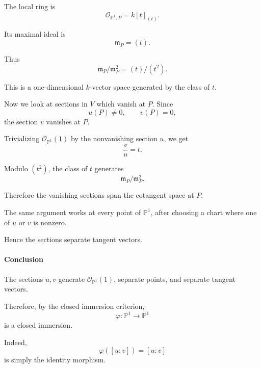 The local ring is
\[
\mathcal O_{\mathbb P^1,P}=k[t]_{(t)}.
\]

Its maximal ideal is
\[
\mathfrak m_P=(t).
\]

Thus
\[
\mathfrak m_P/\mathfrak m_P^2
=
(t)/(t^2).
\]

This is a one-dimensional \(k\)-vector space generated by the class of \(t\).

Now we look at sections in \(V\) which vanish at \(P\). Since
\[
u(P)\neq0,
\qquad
v(P)=0,
\]
the section \(v\) vanishes at \(P\).

Trivializing \(\mathcal O_{\mathbb P^1}(1)\) by the nonvanishing section
\(u\), we get
\[
\frac vu=t.
\]

Modulo \((t^2)\), the class of \(t\) generates
\[
\mathfrak m_P/\mathfrak m_P^2.
\]

Therefore the vanishing sections span the cotangent space at \(P\).

The same argument works at every point of \(\mathbb P^1\), after choosing a
chart where one of \(u\) or \(v\) is nonzero.

Hence the sections separate tangent vectors.

\paragraph*{Conclusion}

The sections \(u,v\) generate \(\mathcal O_{\mathbb P^1}(1)\), separate
points, and separate tangent vectors.

Therefore, by the closed immersion criterion,
\[
\varphi:\mathbb P^1\to\mathbb P^1
\]
is a closed immersion.

Indeed,
\[
\boxed{
	\varphi([u:v])=[u:v]
}
\]
is simply the identity morphism.
